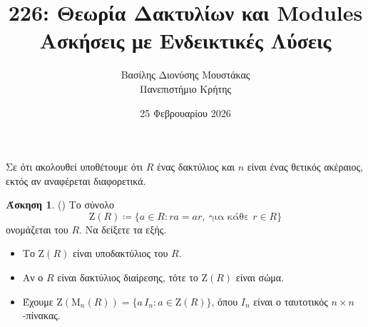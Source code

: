 \documentclass[12pt,a4paper,reqno]{amsart}
\title{226: Θεωρία Δακτυλίων και Modules \\ Ασκήσεις με Ενδεικτικές Λύσεις}
\author[Β.~Δ. Μουστακας]{Βασίλης Διονύσης Μουστάκας \\ Πανεπιστήμιο Κρήτης}
\date{25 Φεβρουαρίου 2026}
\theoremstyle{definition}
\newtheorem{exercise}{Άσκηση}
\newcommand{\rmM}{\mathrm{M}}
\newcommand{\rmZ}{\mathrm{Z}}
\newcommand{\defn}[1]{{\color{mylightblue}{#1}}}
\begin{document}
\begingroup
\def\uppercasenonmath#1{} %
\let\MakeUppercase\relax %
\maketitle
\endgroup

\renewcommand{\thesubsection}{\thesection.\arabic{subsection}}

Σε ότι ακολουθεί υποθέτουμε ότι $R$ ένας δακτύλιος και $n$ είναι ένας θετικός ακέραιος, εκτός αν αναφέρεται διαφορετικά.

\begin{exercise}{\rm(\cite[Ασκήσεις~7.1.7~και~7.2.7]{DF04})}
\label{ex:DF_7.1.7}
Το σύνολο
\[
\rmZ(R) \coloneqq \{a \in R : ra=ar, \ \text{για κάθε $r \in R$}\}
\]
ονομάζεται \defn{κέντρο} του $R$. Να δείξετε τα εξής.
\begin{itemize}
  \item[(1)] Το $\rmZ(R)$ είναι υποδακτύλιος του $R$.
  \item[(2)] Αν ο $R$ είναι δακτύλιος διαίρεσης, τότε το $\rmZ(R)$ είναι σώμα.
  \item[(3)] Έχουμε $\rmZ(\rmM_n(R)) = \{a \, I_n : a \in \rmZ(R)\}$, όπου $I_n$ είναι ο ταυτοτικός $n\times{n}$-πίνακας.
\end{itemize}
\end{exercise}  
\end{document}
